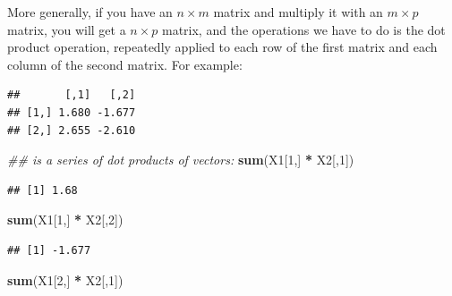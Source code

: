 \documentclass[12pt,]{krantz}
\newenvironment{Shaded}{\begin{snugshade}}{\end{snugshade}}
\newcommand{\CommentTok}[1]{\textcolor[rgb]{0.56,0.35,0.01}{\textit{#1}}}
\newcommand{\DataTypeTok}[1]{\textcolor[rgb]{0.13,0.29,0.53}{#1}}
\newcommand{\DecValTok}[1]{\textcolor[rgb]{0.00,0.00,0.81}{#1}}
\newcommand{\KeywordTok}[1]{\textcolor[rgb]{0.13,0.29,0.53}{\textbf{#1}}}
\newcommand{\NormalTok}[1]{#1}
\newcommand{\OperatorTok}[1]{\textcolor[rgb]{0.81,0.36,0.00}{\textbf{#1}}}
\newcommand{\StringTok}[1]{\textcolor[rgb]{0.31,0.60,0.02}{#1}}
\begin{document}
More generally, if you have an \(n\times m\) matrix and multiply it with an \(m\times p\) matrix, you will get a \(n\times p\) matrix, and the operations we have to do is the dot product operation, repeatedly applied to each row of the first matrix and each column of the second matrix. For example:

\begin{Shaded}
\end{Shaded}

\begin{verbatim}
##       [,1]   [,2]
## [1,] 1.680 -1.677
## [2,] 2.655 -2.610
\end{verbatim}

\begin{Shaded}
\begin{Highlighting}[]
\CommentTok{## is a series of dot products of vectors:}
\KeywordTok{sum}\NormalTok{(X1[}\DecValTok{1}\NormalTok{,] }\OperatorTok{*}\StringTok{ }\NormalTok{X2[,}\DecValTok{1}\NormalTok{])}
\end{Highlighting}
\end{Shaded}

\begin{verbatim}
## [1] 1.68
\end{verbatim}

\begin{Shaded}
\begin{Highlighting}[]
\KeywordTok{sum}\NormalTok{(X1[}\DecValTok{1}\NormalTok{,] }\OperatorTok{*}\StringTok{ }\NormalTok{X2[,}\DecValTok{2}\NormalTok{])}
\end{Highlighting}
\end{Shaded}

\begin{verbatim}
## [1] -1.677
\end{verbatim}

\begin{Shaded}
\begin{Highlighting}[]
\KeywordTok{sum}\NormalTok{(X1[}\DecValTok{2}\NormalTok{,] }\OperatorTok{*}\StringTok{ }\NormalTok{X2[,}\DecValTok{1}\NormalTok{])}
\end{Highlighting}
\end{Shaded}
\end{document}
